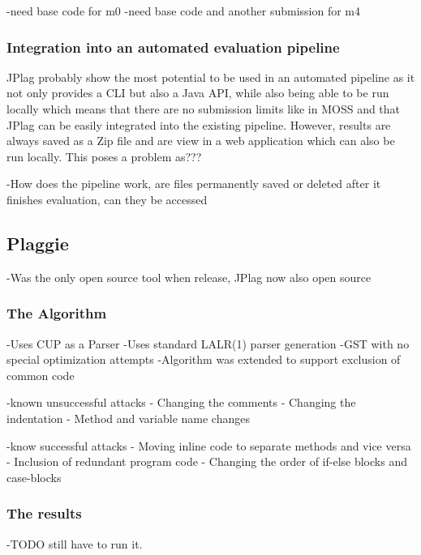 \documentclass[a4paper, 11pt]{article}
\renewcommand{\\}{\vspace*{0.5\baselineskip} \newline}
\begin{document}
{\color{red} 
-need base code for m0
-need base code and another submission for m4
}

\subsubsection{Integration into an automated evaluation pipeline}

JPlag probably show the most potential to be used in an automated pipeline as it not only provides a CLI but also a Java API, while also being able to be
run locally\autocite{JPlagG} which means that there are no submission limits like in MOSS and that JPlag can be easily integrated into the existing pipeline.
However, results are always saved as a Zip file and are view in a web application which can also be run locally. This poses a problem as???

-How does the pipeline work, are files permanently saved or deleted after it finishes evaluation, can they be accessed

\subsection{Plaggie}

-Was the only open source tool when release\autocite{PLAGGIE}, JPlag now also open source

\subsubsection{The Algorithm}

-Uses CUP as a Parser
-Uses standard LALR(1) parser generation\autocite{CUP}
-GST with no special optimization attempts
-Algorithm was extended to support exclusion of common code\autocite[4. Algorithm used]{RMP}

-known unsuccessful attacks
- Changing the comments
- Changing the indentation
- Method and variable name changes\autocite[Known successful attacks]{RMP}

-know successful attacks
- Moving inline code to separate methods and vice versa
- Inclusion of redundant program code
- Changing the order of if-else blocks and case-blocks\autocite[Known unsuccessful attacks]{RMP}

\subsubsection{The results}

-TODO still have to run it.
\end{document}
